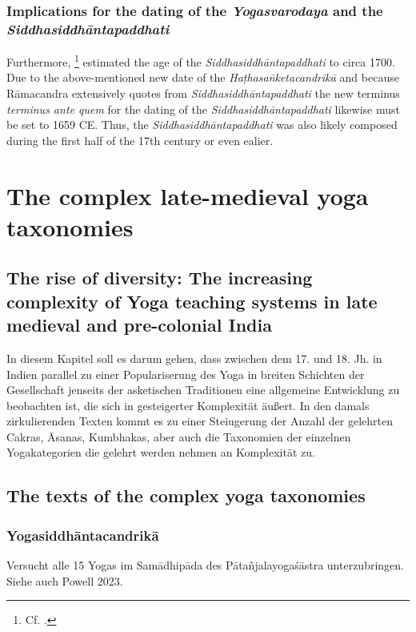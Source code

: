\subsection{Implications for the dating of the \textit{Yogasvarodaya} and the \textit{Siddhasiddhāntapaddhati}}
Furthermore, \citeauthor{mallinsononline2013}\footnote{Cf. .} estimated the age of the \textit{Siddhasiddhāntapaddhati} to circa 1700. Due to the above-mentioned new date of the \textit{Haṭhasaṅketacandrikā} and because Rāmacandra extensively quotes from \textit{Siddhasiddhāntapaddhati} the new terminus \textit{terminus ante quem} for the dating of the \textit{Siddhasiddhāntapaddhati} likewise must be set to 1659 CE. Thus, the \textit{Siddhasiddhāntapaddhati} was also likely composed during the first half of the 17th century or even ealier.


\chapter{The complex late-medieval yoga taxonomies}
\label{yogas_list}
\clearpage


\section{The rise of diversity: The increasing complexity of Yoga teaching systems in late medieval and pre-colonial India}

In diesem Kapitel soll es darum gehen, dass zwischen dem 17. und 18. Jh. in Indien parallel zu einer Populariserung des Yoga in breiten Schichten der Gesellschaft jenseits der asketischen Traditionen eine allgemeine Entwicklung zu beobachten ist, die sich in gesteigerter Komplexität äußert. In den damals zirkulierenden Texten kommt es zu einer Steiugerung der Anzahl der gelehrten Cakras, Āsanas, Kumbhakas, aber auch die Taxonomien der einzelnen Yogakategorien die gelehrt werden nehmen an Komplexität zu. 

\section{The texts of the complex yoga taxonomies}

\subsection{Yogasiddhāntacandrikā}

Versucht alle 15 Yogas im Samādhipāda des Pātañjalayogaśāstra unterzubringen.
Siehe auch Powell 2023. 

